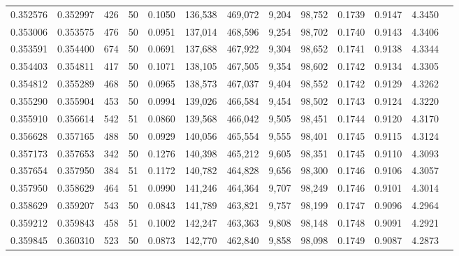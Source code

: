 \begin{tabular}{rrrrrrrrrrrrr}
0.352576 & 0.352997 &   426 &  50 &                                     0.1050 & 136,538 & 469,072 &   9,204 &  98,752 & 0.1739 & 0.9147 & 4.3450 \\
0.353006 & 0.353575 &   476 &  50 &                                     0.0951 & 137,014 & 468,596 &   9,254 &  98,702 & 0.1740 & 0.9143 & 4.3406 \\
0.353591 & 0.354400 &   674 &  50 &                                     0.0691 & 137,688 & 467,922 &   9,304 &  98,652 & 0.1741 & 0.9138 & 4.3344 \\
0.354403 & 0.354811 &   417 &  50 &                                     0.1071 & 138,105 & 467,505 &   9,354 &  98,602 & 0.1742 & 0.9134 & 4.3305 \\
0.354812 & 0.355289 &   468 &  50 &                                     0.0965 & 138,573 & 467,037 &   9,404 &  98,552 & 0.1742 & 0.9129 & 4.3262 \\
0.355290 & 0.355904 &   453 &  50 &                                     0.0994 & 139,026 & 466,584 &   9,454 &  98,502 & 0.1743 & 0.9124 & 4.3220 \\
0.355910 & 0.356614 &   542 &  51 &                                     0.0860 & 139,568 & 466,042 &   9,505 &  98,451 & 0.1744 & 0.9120 & 4.3170 \\
0.356628 & 0.357165 &   488 &  50 &                                     0.0929 & 140,056 & 465,554 &   9,555 &  98,401 & 0.1745 & 0.9115 & 4.3124 \\
0.357173 & 0.357653 &   342 &  50 &                                     0.1276 & 140,398 & 465,212 &   9,605 &  98,351 & 0.1745 & 0.9110 & 4.3093 \\
0.357654 & 0.357950 &   384 &  51 &                                     0.1172 & 140,782 & 464,828 &   9,656 &  98,300 & 0.1746 & 0.9106 & 4.3057 \\
0.357950 & 0.358629 &   464 &  51 &                                     0.0990 & 141,246 & 464,364 &   9,707 &  98,249 & 0.1746 & 0.9101 & 4.3014 \\
0.358629 & 0.359207 &   543 &  50 &                                     0.0843 & 141,789 & 463,821 &   9,757 &  98,199 & 0.1747 & 0.9096 & 4.2964 \\
0.359212 & 0.359843 &   458 &  51 &                                     0.1002 & 142,247 & 463,363 &   9,808 &  98,148 & 0.1748 & 0.9091 & 4.2921 \\
0.359845 & 0.360310 &   523 &  50 &                                     0.0873 & 142,770 & 462,840 &   9,858 &  98,098 & 0.1749 & 0.9087 & 4.2873 \\

\end{tabular}
